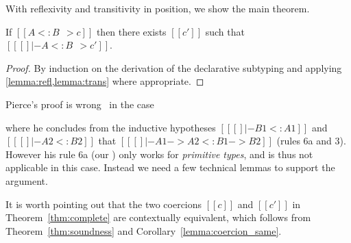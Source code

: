 With reflexivity and transitivity in position, we show the main theorem.

\begin{theorem}[Completeness] \label{thm:complete}
  If $[[A <: B ~~> c]]$ then there exists $[[c']]$ such that $[[ [] |- A <: B ~~> c']]$.
\end{theorem}
\begin{proof}
  By induction on the derivation of the declarative subtyping and applying \cref{lemma:refl,lemma:trans} where appropriate.
\end{proof}
\begin{remark}
  Pierce's proof is wrong~\cite[pp.~20, Case~F]{pierce1989decision} in the case
  \begin{mathpar}
  \end{mathpar}
  where he concludes from the inductive
  hypotheses $[[ [] |- B1 <: A1]]$ and $[[ [] |- A2 <: B2]]$ that $[[ [] |- A1 -> A2 <: B1 -> B2]]$ (rules 6a and 3).
  However his rule 6a (our ) only works for \textit{primitive types}, and is thus not applicable in this case. Instead we
  need a few technical lemmas to support the argument.
\end{remark}

\begin{remark}
  It is worth pointing out that the two coercions $[[c]]$ and $[[c']]$ in
  Theorem~\ref{thm:complete} are contextually equivalent, which follows from
  Theorem~\ref{thm:soundness} and Corollary~\ref{lemma:coercion_same}.
\end{remark}

